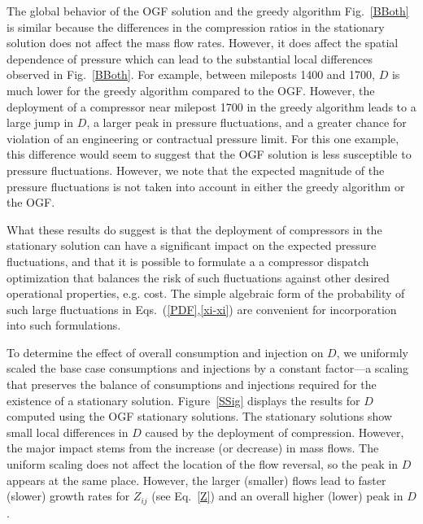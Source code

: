 \documentclass[10pt, conference, compsocconf]{IEEEtran}
\begin{document}
The global behavior of the OGF solution and the greedy algorithm  Fig.~\ref{BBoth} is similar because the differences in the compression ratios in the stationary solution does not affect the mass flow rates.  However, it does affect the spatial dependence of pressure which can lead to the substantial local differences observed in Fig.~\ref{BBoth}.
For example, between mileposts 1400 and 1700, $D$ is much lower for the greedy algorithm compared to the OGF. However, the deployment of a compressor near milepost 1700 in the greedy algorithm leads to a large jump in $D$, a larger peak in pressure fluctuations, and a greater chance for violation of an engineering or contractual pressure limit.  For this one example, this difference would seem to suggest that the OGF solution is less susceptible to pressure fluctuations.  However, we note that the expected magnitude of the pressure fluctuations is not taken into account in either the greedy algorithm or the OGF.

What these results do suggest is that the deployment of compressors in the stationary solution can have a significant impact on the expected pressure fluctuations, and that it is possible to formulate a a compressor dispatch optimization that balances the risk of such fluctuations against other desired operational properties, e.g. cost.  The simple algebraic form of the probability of such large fluctuations in Eqs.~(\ref{PDF},\ref{xi-xi}) are convenient for incorporation into such formulations.





To determine the effect of overall consumption and injection on $D$,
we uniformly scaled the base case consumptions and injections by a constant factor---a scaling that preserves the balance of consumptions and injections required for the existence of a stationary solution. Figure~\ref{SSig} displays the results for $D$ computed using the OGF stationary solutions.  The stationary solutions show small local differences in $D$ caused by the deployment of compression. However, the major impact stems from the increase (or decrease) in mass flows.  The uniform scaling does not affect the location of the flow reversal, so the peak in $D$ appears at the same place.  However, the larger (smaller) flows lead to faster (slower) growth rates for $Z_{ij}$ (see Eq.~\ref{Z}) and an overall higher (lower) peak in $D$.
\end{document}
